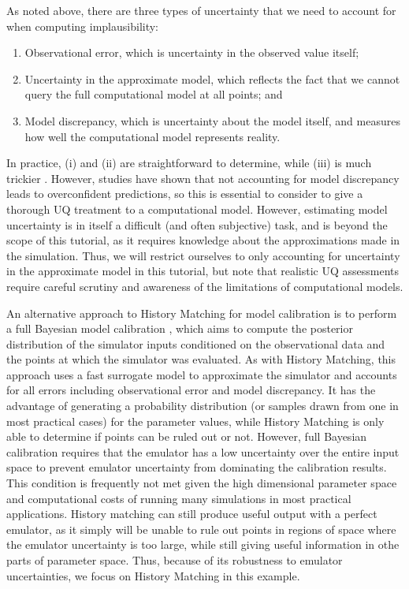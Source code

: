\documentclass[openacc]{rstransa}%
\begin{document}
As noted above, there are three types of uncertainty that we need to account for when computing implausibility:

\begin{enumerate}
\item Observational error, which is uncertainty in the observed value itself;
\item Uncertainty in the approximate model, which reflects the fact that we cannot query the full computational model at all points; and
\item Model discrepancy, which is uncertainty about the model itself, and measures how well the computational model represents reality.
\end{enumerate}

In practice, (i) and (ii) are straightforward to determine, while (iii) is much trickier \cite{modeldiscrep}. However, studies have shown that not accounting for model discrepancy leads to overconfident predictions, so this is essential to consider to give a thorough UQ treatment to a computational model. However, estimating model uncertainty is in itself a difficult (and often subjective) task, and is beyond the scope of this tutorial, as it requires knowledge about the approximations made in the simulation. Thus, we will restrict ourselves to only accounting for uncertainty in the approximate model in this tutorial, but note that realistic UQ assessments require careful scrutiny and awareness of the limitations of computational models.

An alternative approach to History Matching for model calibration is to
perform a full Bayesian model calibration \cite{calibration},
which aims to compute the posterior
distribution of the simulator inputs conditioned on the observational data
and the points at which the simulator was evaluated.
As with History Matching, this approach uses a fast surrogate model to
approximate the simulator and accounts for all errors including observational
error and model discrepancy. It has the advantage of generating a probability
distribution (or samples drawn from one in most practical cases) for the
parameter values, while History Matching is only able to determine if
points can be ruled out or not.
However, full Bayesian calibration requires that
the emulator has a low uncertainty over the entire input space to prevent
emulator uncertainty from dominating the calibration
results. This condition is frequently not met given the high dimensional
parameter space and computational costs of running many simulations in
most practical applications.
History matching can still produce useful output with a perfect
emulator, as it simply will be unable to rule out points in regions of
space where the emulator uncertainty is too large, while still giving
useful information in othe parts of parameter space. Thus, because of
its robustness to emulator uncertainties, we focus on History Matching
in this example.
\end{document}
